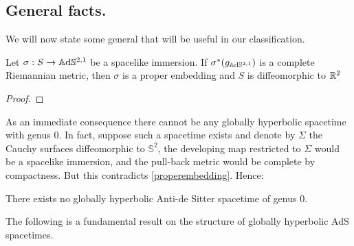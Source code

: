\subsection{General facts.} We will now state some general that will be useful in our classification.

\begin{lemma}\label{properembedding}
    Let $\sigma:S\to\mathbb{A}\mathrm{d}\mathbb{S}^{2,1}$ be a spacelike immersion. If $\sigma^*(g_{\mathbb{A}\mathrm{d}\mathbb{S}^{2,1}})$ is a complete Riemannian metric, then $\sigma$ is a proper embedding and $S$ is diffeomorphic to $\mathbb{R}^2$
\end{lemma}
\begin{proof}
    
\end{proof}

As an immediate consequence there cannot be any globally hyperbolic spacetime with genus $0$. In fact, suppose such a spacetime exists and denote by $\Sigma$ the Cauchy surfaces diffeomorphic to $\mathbb{S}^2$, the developing map restricted to $\Sigma$ would be a spacelike immersion, and the pull-back metric would be complete by compactness. But this contradicts \ref{properembedding}. Hence: 

\begin{corollary}
    There exists no globally hyperbolic Anti-de Sitter spacetime of genus 0. 
\end{corollary}

The following is a fundamental result on the structure of globally hyperbolic AdS spacetimes.

